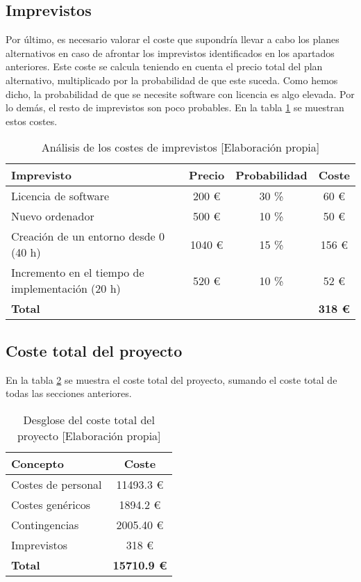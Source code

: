 \subsection{Imprevistos}

Por último, es necesario valorar el coste que supondría llevar a cabo los planes alternativos en caso de afrontar los imprevistos identificados en los apartados anteriores. Este coste se calcula teniendo en cuenta el precio total del plan alternativo, multiplicado por la probabilidad de que este suceda. Como hemos dicho, la probabilidad de que se necesite software con licencia es algo elevada. Por lo demás, el resto de imprevistos son poco probables. En la tabla \ref{tab:imprevistos} se muestran estos costes.

\begin{table}[ht]
    \begin{center}
        \begin{tabular}{ l  c  c  c }
        \textbf{Imprevisto} & \textbf{Precio} & \textbf{Probabilidad} & \textbf{Coste} \\
        \hline
        Licencia de software & 200 € & 30 \% & 60 € \\
        Nuevo ordenador & 500 € & 10 \%  & 50 € \\
        Creación de un entorno desde 0 (40 h) & 1040 € & 15 \% & 156 €\\
        Incremento en el tiempo de implementación (20 h) & 520 € & 10 \% & 52 € \\
        \hline
        \textbf{Total} & & & \textbf{318 €} \\
        \end{tabular}
        \caption{Análisis de los costes de imprevistos [Elaboración propia]}
        \label{tab:imprevistos}
    \end{center}
\end{table}

\subsection{Coste total del proyecto}
En la tabla \ref{tab:coste_total} se muestra el coste total del proyecto, sumando el coste total de todas las secciones anteriores.
\begin{table}[h]
    \begin{center}
        \begin{tabular}{ l  c }
        \textbf{Concepto} & \textbf{Coste} \\
        \hline
        Costes de personal      & 11493.3 € \\
        Costes genéricos        & 1894.2 €  \\
        Contingencias           & 2005.40 € \\
        Imprevistos             & 318 €  \\
        \hline
        \textbf{Total} & \textbf{15710.9 €} \\
        \end{tabular}
        \caption{Desglose del coste total del proyecto [Elaboración propia]}
        \label{tab:coste_total}
    \end{center}
\end{table}

